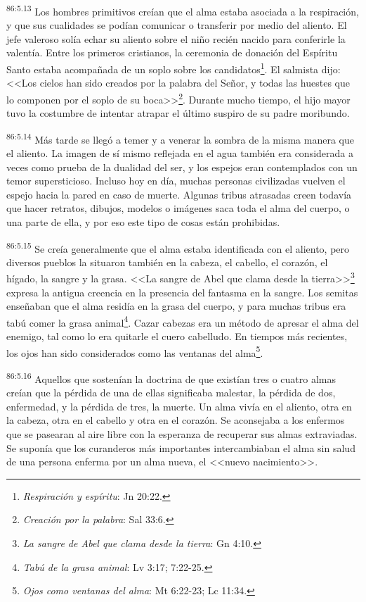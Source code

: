 \par
\textsuperscript{86:5.13} Los hombres primitivos creían que el alma estaba asociada a la respiración, y que sus cualidades se podían comunicar o transferir por medio del aliento. El jefe valeroso solía echar su aliento sobre el niño recién nacido para conferirle la valentía. Entre los primeros cristianos, la ceremonia de donación del Espíritu Santo estaba acompañada de un soplo sobre los candidatos\footnote{\textit{Respiración y espíritu}: Jn 20:22.}. El salmista dijo: <<Los cielos han sido creados por la palabra del Señor, y todas las huestes que lo componen por el soplo de su boca>>\footnote{\textit{Creación por la palabra}: Sal 33:6.}. Durante mucho tiempo, el hijo mayor tuvo la costumbre de intentar atrapar el último suspiro de su padre moribundo.

\par
\textsuperscript{86:5.14} Más tarde se llegó a temer y a venerar la sombra de la misma manera que el aliento. La imagen de sí mismo reflejada en el agua también era considerada a veces como prueba de la dualidad del ser, y los espejos eran contemplados con un temor supersticioso. Incluso hoy en día, muchas personas civilizadas vuelven el espejo hacia la pared en caso de muerte. Algunas tribus atrasadas creen todavía que hacer retratos, dibujos, modelos o imágenes saca toda el alma del cuerpo, o una parte de ella, y por eso este tipo de cosas están prohibidas.

\par
\textsuperscript{86:5.15} Se creía generalmente que el alma estaba identificada con el aliento, pero diversos pueblos la situaron también en la cabeza, el cabello, el corazón, el hígado, la sangre y la grasa. <<La sangre de Abel que clama desde la tierra>>\footnote{\textit{La sangre de Abel que clama desde la tierra}: Gn 4:10.} expresa la antigua creencia en la presencia del fantasma en la sangre. Los semitas enseñaban que el alma residía en la grasa del cuerpo, y para muchas tribus era tabú comer la grasa animal\footnote{\textit{Tabú de la grasa animal}: Lv 3:17; 7:22-25.}. Cazar cabezas era un método de apresar el alma del enemigo, tal como lo era quitarle el cuero cabelludo. En tiempos más recientes, los ojos han sido considerados como las ventanas del alma\footnote{\textit{Ojos como ventanas del alma}: Mt 6:22-23; Lc 11:34.}.

\par
\textsuperscript{86:5.16} Aquellos que sostenían la doctrina de que existían tres o cuatro almas creían que la pérdida de una de ellas significaba malestar, la pérdida de dos, enfermedad, y la pérdida de tres, la muerte. Un alma vivía en el aliento, otra en la cabeza, otra en el cabello y otra en el corazón. Se aconsejaba a los enfermos que se pasearan al aire libre con la esperanza de recuperar sus almas extraviadas. Se suponía que los curanderos más importantes intercambiaban el alma sin salud de una persona enferma por un alma nueva, el <<nuevo nacimiento>>.

